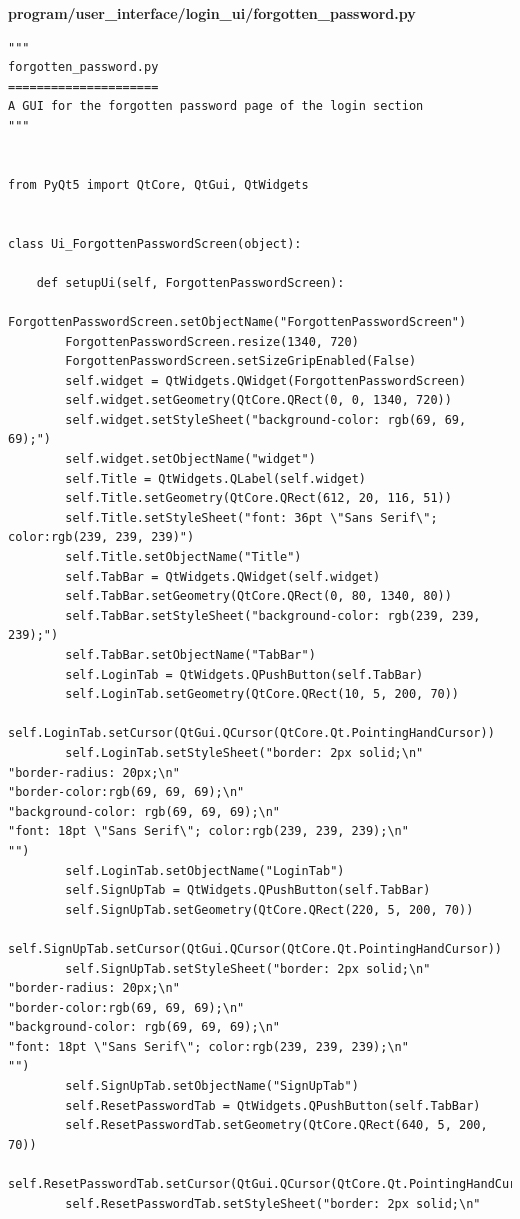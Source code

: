 \documentclass{article}
\begin{document}
\textbf{program/user\_interface/login\_ui/forgotten\_password.py}
\begin{lstlisting}
"""
forgotten_password.py
=====================
A GUI for the forgotten password page of the login section
"""


from PyQt5 import QtCore, QtGui, QtWidgets


class Ui_ForgottenPasswordScreen(object):

    def setupUi(self, ForgottenPasswordScreen):
        ForgottenPasswordScreen.setObjectName("ForgottenPasswordScreen")
        ForgottenPasswordScreen.resize(1340, 720)
        ForgottenPasswordScreen.setSizeGripEnabled(False)
        self.widget = QtWidgets.QWidget(ForgottenPasswordScreen)
        self.widget.setGeometry(QtCore.QRect(0, 0, 1340, 720))
        self.widget.setStyleSheet("background-color: rgb(69, 69, 69);")
        self.widget.setObjectName("widget")
        self.Title = QtWidgets.QLabel(self.widget)
        self.Title.setGeometry(QtCore.QRect(612, 20, 116, 51))
        self.Title.setStyleSheet("font: 36pt \"Sans Serif\"; color:rgb(239, 239, 239)")
        self.Title.setObjectName("Title")
        self.TabBar = QtWidgets.QWidget(self.widget)
        self.TabBar.setGeometry(QtCore.QRect(0, 80, 1340, 80))
        self.TabBar.setStyleSheet("background-color: rgb(239, 239, 239);")
        self.TabBar.setObjectName("TabBar")
        self.LoginTab = QtWidgets.QPushButton(self.TabBar)
        self.LoginTab.setGeometry(QtCore.QRect(10, 5, 200, 70))
        self.LoginTab.setCursor(QtGui.QCursor(QtCore.Qt.PointingHandCursor))
        self.LoginTab.setStyleSheet("border: 2px solid;\n"
"border-radius: 20px;\n"
"border-color:rgb(69, 69, 69);\n"
"background-color: rgb(69, 69, 69);\n"
"font: 18pt \"Sans Serif\"; color:rgb(239, 239, 239);\n"
"")
        self.LoginTab.setObjectName("LoginTab")
        self.SignUpTab = QtWidgets.QPushButton(self.TabBar)
        self.SignUpTab.setGeometry(QtCore.QRect(220, 5, 200, 70))
        self.SignUpTab.setCursor(QtGui.QCursor(QtCore.Qt.PointingHandCursor))
        self.SignUpTab.setStyleSheet("border: 2px solid;\n"
"border-radius: 20px;\n"
"border-color:rgb(69, 69, 69);\n"
"background-color: rgb(69, 69, 69);\n"
"font: 18pt \"Sans Serif\"; color:rgb(239, 239, 239);\n"
"")
        self.SignUpTab.setObjectName("SignUpTab")
        self.ResetPasswordTab = QtWidgets.QPushButton(self.TabBar)
        self.ResetPasswordTab.setGeometry(QtCore.QRect(640, 5, 200, 70))
        self.ResetPasswordTab.setCursor(QtGui.QCursor(QtCore.Qt.PointingHandCursor))
        self.ResetPasswordTab.setStyleSheet("border: 2px solid;\n"

\end{lstlisting}
\end{document}
